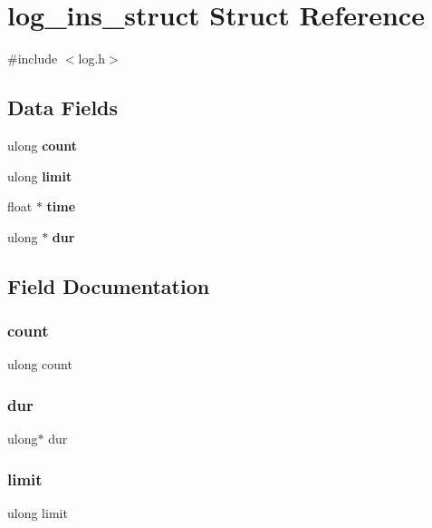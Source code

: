 \section{log\+\_\+ins\+\_\+struct Struct Reference}
\label{structlog__ins__struct}


{\ttfamily \#include $<$log.\+h$>$}

\subsection*{Data Fields}
\begin{DoxyCompactItemize}
\item 
ulong \textbf{ count}
\item 
ulong \textbf{ limit}
\item 
float $\ast$ \textbf{ time}
\item 
ulong $\ast$ \textbf{ dur}
\end{DoxyCompactItemize}


\subsection{Field Documentation}
\mbox{\label{structlog__ins__struct_aec2cfcb08132e96314e07b96dcda60fe}} 
\subsubsection{count}
{\footnotesize\ttfamily ulong count}

\mbox{\label{structlog__ins__struct_a9b72b5e4d4f698f873cbf1cbf431aaa7}} 
\subsubsection{dur}
{\footnotesize\ttfamily ulong$\ast$ dur}

\mbox{\label{structlog__ins__struct_a1aafeaebc23c5017e813ab4816d159e8}} 
\subsubsection{limit}
{\footnotesize\ttfamily ulong limit}

